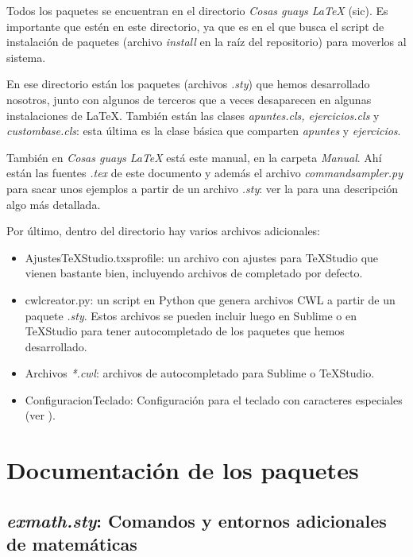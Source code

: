 Todos los paquetes se encuentran en el directorio \textit{Cosas guays LaTeX} (sic). Es importante que estén en este directorio, ya que es en el que busca el script de instalación de paquetes (archivo \textit{install} en la raíz del repositorio) para moverlos al sistema.

En ese directorio están los paquetes (archivos \textit{.sty}) que hemos desarrollado nosotros, junto con algunos de terceros que a veces desaparecen en algunas instalaciones de \LaTeX. También están las clases \textit{apuntes.cls, ejercicios.cls} y \textit{custombase.cls}: esta última es la clase básica que comparten \textit{apuntes} y \textit{ejercicios}.

También en \textit{Cosas guays LaTeX} está este manual, en la carpeta \textit{Manual}. Ahí están las fuentes \textit{.tex} de este documento y además el archivo \textit{commandsampler.py} para sacar unos ejemplos a partir de un archivo \textit{.sty}: ver la  para una descripción algo más detallada.

Por último, dentro del directorio hay varios archivos adicionales:

\begin{itemize}
\item AjustesTeXStudio.txsprofile: un archivo con ajustes para TeXStudio que vienen bastante bien, incluyendo archivos de completado por defecto.
\item {} cwlcreator.py: un script en Python que genera archivos CWL a partir de un paquete \textit{.sty}. Estos archivos se pueden incluir luego en Sublime o en TeXStudio para tener autocompletado de los paquetes que hemos desarrollado.
\item Archivos \textit{*.cwl}: archivos de autocompletado para Sublime o TeXStudio.
\item ConfiguracionTeclado: Configuración para el teclado con caracteres especiales (ver ).
\end{itemize}

\section{Documentación de los paquetes}

\subsection{\textit{exmath.sty}: Comandos y entornos adicionales de matemáticas}
\label{sec:Exmath}

